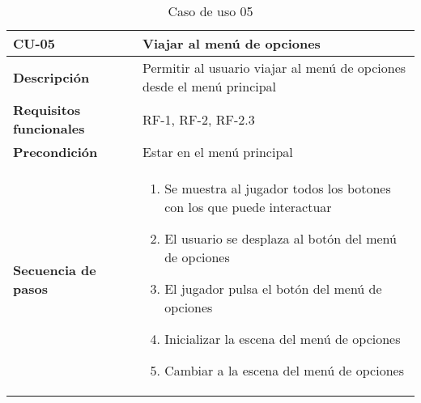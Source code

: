 \begin{longtable}{l|l}
\caption{Caso de uso 05}\\
\begin{minipage}{0.25\columnwidth}
\textbf{CU-05} 
\end{minipage}
&
\begin{minipage}{0.65\columnwidth}
Viajar al menú de opciones
\end{minipage}
\\ \hline

\begin{minipage}{0.25\columnwidth}
\textbf{Descripción} 
\end{minipage}
&
\begin{minipage}{0.65\columnwidth}
Permitir al usuario viajar al menú de opciones desde el menú principal
\end{minipage}
\\ \hline

\begin{minipage}{0.25\columnwidth}
\textbf{Requisitos funcionales} 
\end{minipage}
&
\begin{minipage}{0.65\columnwidth}
RF-1, RF-2, RF-2.3
\end{minipage}
\\ \hline

\begin{minipage}{0.25\columnwidth}
\textbf{Precondición} 
\end{minipage}
&
\begin{minipage}{0.65\columnwidth}
Estar en el menú principal
\end{minipage}
\\ \hline

\begin{minipage}{0.25\columnwidth}
\textbf{Secuencia de pasos} 
\end{minipage}
&
\begin{minipage}{0.65\columnwidth}
\begin{enumerate}
\item
Se muestra al jugador todos los botones con los que puede interactuar
\item
El usuario se desplaza al botón del menú de opciones
\item
El jugador pulsa el botón del menú de opciones
\item
Inicializar la escena del menú de opciones
\item
Cambiar a la escena del menú de opciones
\end{enumerate}
\end{minipage}
\\ \hline


\end{longtable}
